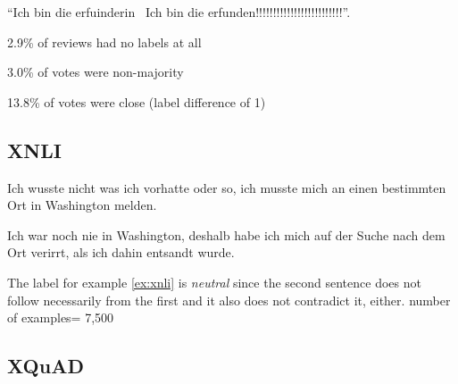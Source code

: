 \begin{examples}
	\item ``Ich bin die erfuinderin \textbar \textbar\ Ich bin die erfunden!!!!!!!!!!!!!!!!!!!!!!!!!''.
\end{examples}

2.9\% of reviews had no labels at all 

3.0\% of votes were non-majority

13.8\% of votes were close (label difference of 1)

\subsection{XNLI}

\cite{conneau2018xnli}


\begin{examples}
	\label{ex:xnli}
	\item Ich wusste nicht was ich vorhatte oder so, ich musste mich an einen bestimmten Ort in Washington melden.

        Ich war noch nie in Washington, deshalb habe ich mich auf der Suche nach dem Ort verirrt, als ich dahin entsandt wurde.
\end{examples}

The label for example \ref{ex:xnli} is \emph{neutral} since the second sentence does not follow necessarily from the first and it also does not contradict it, either.
number of examples= 7,500

\subsection{XQuAD}

